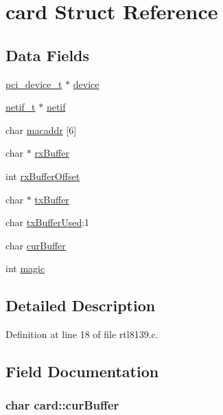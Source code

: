 \hypertarget{structcard}{\section{card Struct Reference}
\label{structcard}
}
\subsection*{Data Fields}
\begin{DoxyCompactItemize}
\item 
\hyperlink{pci_8h_ab3c98ba0de1f963ef2f46200b090815b}{pci\+\_\+device\+\_\+t} $\ast$ \hyperlink{structcard_ac4d735012434df4c445edaffce28bd73}{device}
\item 
\hyperlink{netif_8h_af6c73b8fa12396c0382f58d63e895008}{netif\+\_\+t} $\ast$ \hyperlink{structcard_ab3123a3dbb6dc38d86488ab37f7759ae}{netif}
\item 
char \hyperlink{structcard_abe96f3126aa0a28b86a1748ad1f83f81}{macaddr} \mbox{[}6\mbox{]}
\item 
char $\ast$ \hyperlink{structcard_a5cd3278f0e24fb6942e726b61bb032a6}{rx\+Buffer}
\item 
int \hyperlink{structcard_a9492d8053fa4c304877e1f9959b48731}{rx\+Buffer\+Offset}
\item 
char $\ast$ \hyperlink{structcard_a733cf5ffa3a9d2bf6cf28473817915b6}{tx\+Buffer}
\item 
char \hyperlink{structcard_a2294d3601ad6be7638b30f68496d589e}{tx\+Buffer\+Used}\+:1
\item 
char \hyperlink{structcard_adc7cfe07c57eb29b36d674ce0312c7ac}{cur\+Buffer}
\item 
int \hyperlink{structcard_a63721f311b12c89790089bbcacc0060b}{magic}
\end{DoxyCompactItemize}


\subsection{Detailed Description}


Definition at line 18 of file rtl8139.\+c.



\subsection{Field Documentation}
\hypertarget{structcard_adc7cfe07c57eb29b36d674ce0312c7ac}{
\subsubsection[{cur\+Buffer}]{\setlength{\rightskip}{0pt plus 5cm}char card\+::cur\+Buffer}}\label{structcard_adc7cfe07c57eb29b36d674ce0312c7ac}


